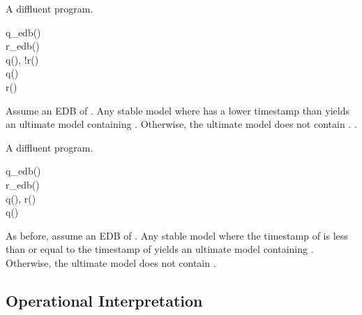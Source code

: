 \begin{example}
\label{ex:diffluent1}
A diffluent \lang program.  

\begin{Drules}
        {q\_edb()} \\
        {r\_edb()} \\
        {q(), !r()} \\
        {q()} \\
        {r()}
\end{Drules}

Assume an EDB of .  Any stable model where  has a lower timestamp than  yields an ultimate model containing .  Otherwise, the ultimate model does not contain .  .
\end{example}

\begin{example}
\label{ex:diffluent2}
A diffluent \lang program.
\begin{Drules}
        {q\_edb()} \\
        {r\_edb()} \\
        {q(), r()} \\
        {q()}
\end{Drules}

As before, assume an EDB of .  Any stable model where the timestamp of  is less than or equal to the timestamp of  yields an ultimate model containing .  Otherwise, the ultimate model does not contain .
\end{example}

\subsection{Operational Interpretation}
\label{sec:operational}

